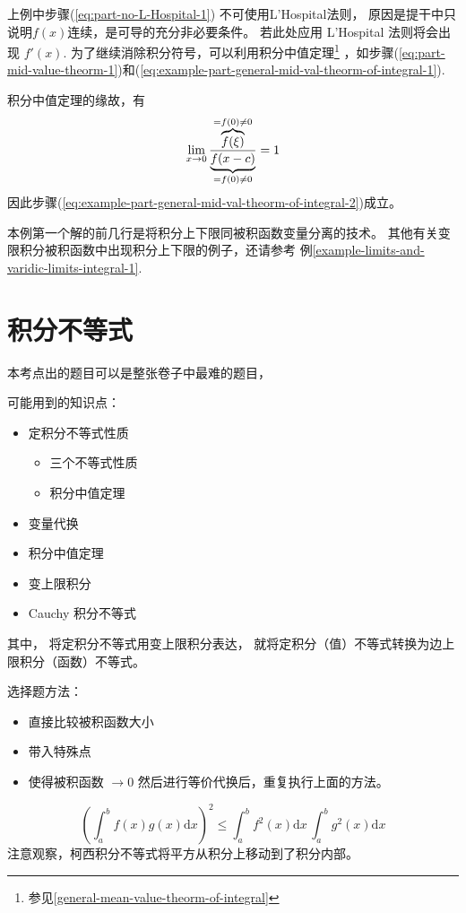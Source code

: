 上例中步骤(\ref{eq:part-no-L-Hospital-1}) 不可使用L'Hospital法则，
原因是提干中只说明$f(x)$连续，是可导的充分非必要条件。
若此处应用 L'Hospital 法则将会出现 $f'(x)$.
为了继续消除积分符号，可以利用积分中值定理\footnote{参见\ref{general-mean-value-theorm-of-integral}}
，如步骤(\ref{eq:part-mid-value-theorm-1})和(\ref{eq:example-part-general-mid-val-theorm-of-integral-1}).

积分中值定理的缘故，有 
\[
    \lim_{x \to 0} 
    \dfrac{
        \overbrace{f(\xi)}^{\mathclap{=f(0) \neq 0}}
    } {
        \underbrace{f(x - c)}_{\mathclap{=f(0)\neq 0}}
    } = 1
\]
因此步骤(\ref{eq:example-part-general-mid-val-theorm-of-integral-2})成立。

本例第一个解的前几行是将积分上下限同被积函数变量分离的技术。
其他有关变限积分被积函数中出现积分上下限的例子，还请参考
例\ref{example-limits-and-varidic-limits-integral-1}.

\section{积分不等式}

本考点出的题目可以是整张卷子中最难的题目，

可能用到的知识点：
\begin{itemize}
    \item 定积分不等式性质
        \begin{itemize}
            \item 三个不等式性质
            \item 积分中值定理
        \end{itemize}
    \item 变量代换
    \item 积分中值定理
    \item 变上限积分
    \item Cauchy 积分不等式
\end{itemize}

其中，
将定积分不等式用变上限积分表达，
就将定积分（值）不等式转换为边上限积分（函数）不等式。

选择题方法：
\begin{itemize}
    \item 直接比较被积函数大小 
    \item 带入特殊点
    \item 使得被积函数 $\to 0$ 然后进行等价代换后，重复执行上面的方法。
\end{itemize}

\begin{theorem}\label{Cauchy-integral-inequlity}
    \[
        \left(\int_a^b f(x)g(x) \mathrm{d}x\right)^2 
        \leq 
        \int_a^b f^2(x) \mathrm{d}x\, \int_a^b g^2(x) \mathrm{d}x
    \]
    注意观察，柯西积分不等式将平方从积分上移动到了积分内部。
\end{theorem}

